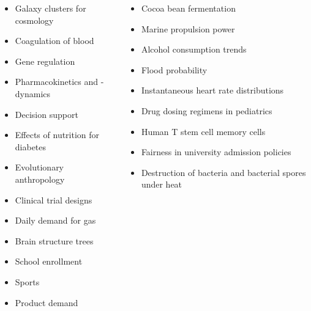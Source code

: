 \documentclass[english,t]{beamer}
\begin{document}
\begin{frame}

  \begin{columns}[T] %
 \begin{column}{.49\textwidth}
{  \footnotesize
  \begin{itemize}
 \item Galaxy clusters for cosmology
 \item Coagulation of blood
 \item Gene regulation
 \item Pharmacokinetics and -dynamics
 \item Decision support
 \item Effects of nutrition for diabetes
 \item Evolutionary anthropology
 \item Clinical trial designs
 \item Daily demand for gas
 \item Brain structure trees
 \item School enrollment
 \item Sports
 \item Product demand
 \end{itemize}
 }
\end{column}
 \begin{column}{.49\textwidth}
{    \footnotesize
  \begin{itemize}
 \item Cocoa bean fermentation
 \item Marine propulsion power
 \item Alcohol consumption trends
 \item Flood probability
 \item Instantaneous heart rate distributions
 \item Drug dosing regimens in pediatrics
 \item Human T stem cell memory cells
 \item Fairness in university admission policies
 \item Destruction of bacteria and bacterial spores under heat
 \end{itemize}
 }
\end{column}
\end{columns}
\end{frame}
\end{document}

